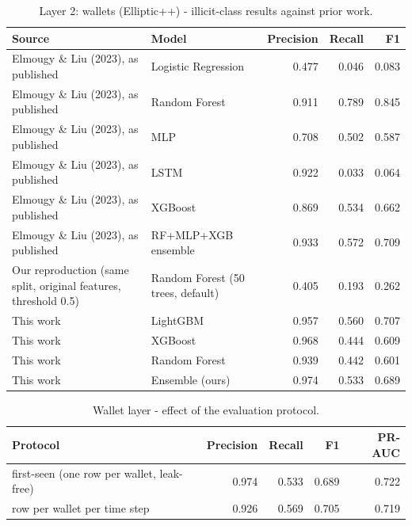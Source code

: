 \begin{table}[t]
\centering
\caption{Layer 2: wallets (Elliptic++) - illicit-class results against prior work.}
\label{tab:wallet-literature}
\begin{tabular}{llrrr}
\toprule
Source & Model & Precision & Recall & F1 \\
\midrule
Elmougy \& Liu (2023), as published & Logistic Regression & 0.477 & 0.046 & 0.083 \\
Elmougy \& Liu (2023), as published & Random Forest & 0.911 & 0.789 & 0.845 \\
Elmougy \& Liu (2023), as published & MLP & 0.708 & 0.502 & 0.587 \\
Elmougy \& Liu (2023), as published & LSTM & 0.922 & 0.033 & 0.064 \\
Elmougy \& Liu (2023), as published & XGBoost & 0.869 & 0.534 & 0.662 \\
Elmougy \& Liu (2023), as published & RF+MLP+XGB ensemble & 0.933 & 0.572 & 0.709 \\
Our reproduction (same split, original features, threshold 0.5) & Random Forest (50 trees, default) & 0.405 & 0.193 & 0.262 \\
This work & LightGBM & 0.957 & 0.560 & 0.707 \\
This work & XGBoost & 0.968 & 0.444 & 0.609 \\
This work & Random Forest & 0.939 & 0.442 & 0.601 \\
This work & Ensemble (ours) & 0.974 & 0.533 & 0.689 \\
\bottomrule
\end{tabular}
\end{table}

\begin{table}[t]
\centering
\caption{Wallet layer - effect of the evaluation protocol.}
\label{tab:wallet-protocol}
\begin{tabular}{lrrrr}
\toprule
Protocol & Precision & Recall & F1 & PR-AUC \\
\midrule
first-seen (one row per wallet, leak-free) & 0.974 & 0.533 & 0.689 & 0.722 \\
row per wallet per time step & 0.926 & 0.569 & 0.705 & 0.719 \\
\bottomrule
\end{tabular}
\end{table}


